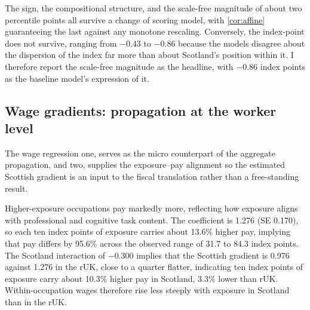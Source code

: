 The sign, the compositional structure, and the scale-free magnitude of about two percentile points all survive a change of scoring model, with \cref{cor:affine} guaranteeing the last against any monotone rescaling. Conversely, the index-point does not survive, ranging from $-0.43$ to $-0.86$ because the models disagree about the dispersion of the index far more than about Scotland's position within it. I therefore report the scale-free magnitude as the headline, with $-0.86$ index points as the baseline model's expression of it. 

\subsection{Wage gradients: propagation at the worker level}\label{sec:wages}

The wage regression one, serves as the micro counterpart of the aggregate propagation, and two, supplies the exposure--pay alignment so the estimated Scottish gradient is an input to the fiscal translation rather than a free-standing result.

\begin{table}[t]
\centering
\caption{Exposure--wage regression}
\label{tab:wagespecs}

\end{table}

Higher-exposure occupations pay markedly more, reflecting how exposure aligns with professional and cognitive task content. The coefficient is 1.276 (SE 0.170), so each ten index points of exposure carries about 13.6\% higher pay, implying that pay differs by 95.6\% across the observed range of 31.7 to 84.3 index points. The Scotland interaction of $-0.300$ implies that the Scottish gradient is 0.976 against 1.276 in the rUK, close to a quarter flatter, indicating ten index points of exposure carry about 10.3\% higher pay in Scotland, 3.3\% lower than rUK.
Within-occupation wages therefore rise less steeply with exposure in Scotland than in the rUK.

